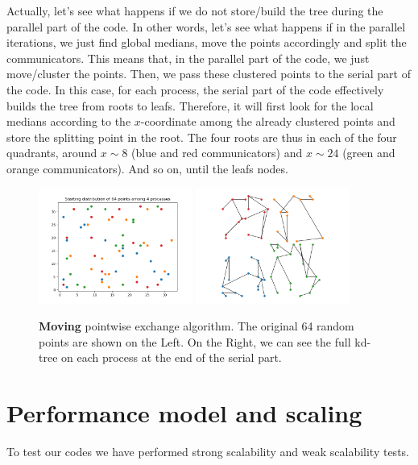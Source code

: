 \documentclass[amssymb, aps,nofootinbib, superscriptaddress, notitlepage]{revtex4}
\begin{document}
Actually, let's see what happens if we do not store/build the tree during the parallel part of the code.
In other words, let's see what happens if in the  parallel iterations, we just find global medians, move the points accordingly and split the communicators. 
This means that, in the parallel part of the code, we just move/cluster the points. 
Then, we pass these clustered points to the serial part of the code. 
In this case, for each process, the serial part of the code  effectively builds the tree from roots to leafs.
Therefore, it will first look for the local medians according to the $x$-coordinate among the already clustered points and store the splitting point in the root. The four roots are thus in each of the four quadrants, around $x\sim 8$ (blue and red communicators) and $x\sim 24$ (green and orange communicators). And so on, until the leafs nodes.
\begin{figure}
  \centering
        \includegraphics[width=0.45\textwidth]{img/Starting_64.png}
            \includegraphics[width=0.45\textwidth]{img/mpiP2P.png}
 \caption{\textbf{Moving} pointwise exchange algorithm. The original 64 random points are shown on the Left. 
On the Right, we can see the full kd-tree on each process at the end of the serial part. }
\label{P2P_M}
\end{figure}


\section{Performance model and scaling}
To test our codes we have performed strong scalability and weak scalability tests.
\end{document}

